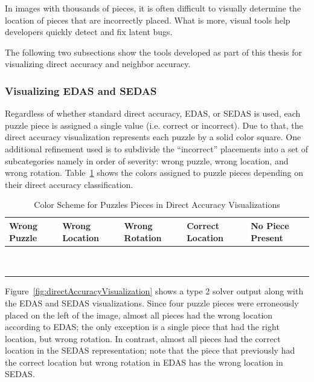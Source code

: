 \documentclass{report}
\begin{document}
In images with thousands of pieces, it is often difficult to visually determine the location of pieces that are incorrectly placed.  What is more, visual tools help developers quickly detect and fix latent bugs.

The following two subsections show the tools developed as part of this thesis for visualizing direct accuracy and neighbor accuracy.

\subsubsection{Visualizing EDAS and SEDAS}\label{sec:visualizingEdasSedas}

Regardless of whether standard direct accuracy, EDAS, or SEDAS is used, each puzzle piece is assigned a single value (i.e. correct or incorrect).  Due to that, the direct accuracy visualization represents each puzzle by a solid color square.  One additional refinement used is to subdivide the ``incorrect'' placements into a set of subcategories namely in order of severity: wrong puzzle, wrong location, and wrong rotation.  Table~\ref{tab:directAccuracyColors} shows the colors assigned to puzzle pieces depending on their direct accuracy classification.

\begin{table}[h]
	\begin{center}
  		\begin{tabular}{ | >{\centering\arraybackslash}m{0.6in} | >{\centering\arraybackslash}m{0.6in} | >{\centering\arraybackslash}m{0.6in} | >{\centering\arraybackslash}m{0.6in} | >{\centering\arraybackslash}m{0.6in} | }
 \hline
    		Wrong Puzzle & Wrong Location & Wrong Rotation & Correct Location  & No Piece Present  \\ \hline
			{\cellcolor{blue}~} & {\cellcolor{red}~}  & {\cellcolor{orange}~}  & {\cellcolor{green}~} & {\cellcolor{black}~}  \\
			{\cellcolor{blue}~} & {\cellcolor{red}~}  & {\cellcolor{orange}~}  & {\cellcolor{green}~} & {\cellcolor{black}~} \\
 \hline
		\end{tabular}
	\end{center}
\caption{Color Scheme for Puzzles Pieces in Direct Accuracy Visualizations}\label{tab:directAccuracyColors}
\end{table}

Figure~\ref{fig:directAccuracyVisualization} shows a type 2 solver output along with the EDAS and SEDAS visualizations. Since four puzzle pieces were erroneously placed on the left of the image, almost all pieces had the wrong location according to EDAS; the only exception is a single piece that had the right location, but wrong rotation.  In contrast, almost all pieces had the correct location in the SEDAS representation; note that the piece that previously had the correct location but wrong rotation in EDAS has the wrong location in SEDAS.
\end{document}
